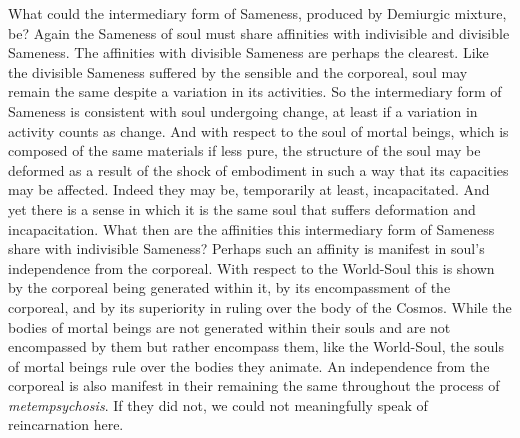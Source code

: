 What could the intermediary form of Sameness, produced by Demiurgic mixture, be? Again the Sameness of soul must share affinities with indivisible and divisible Sameness. The affinities with divisible Sameness are perhaps the clearest. Like the divisible Sameness suffered by the sensible and the corporeal, soul may remain the same despite a variation in its activities. So the intermediary form of Sameness is consistent with soul undergoing change, at least if a variation in activity counts as change. And with respect to the soul of mortal beings, which is composed of the same materials if less pure, the structure of the soul may be deformed as a result of the shock of embodiment in such a way that its capacities may be affected. Indeed they may be, temporarily at least, incapacitated. And yet there is a sense in which it is the same soul that suffers deformation and incapacitation. What then are the affinities this intermediary form of Sameness share with indivisible Sameness? Perhaps such an affinity is manifest in soul's independence from the corporeal. With respect to the World-Soul this is shown by the corporeal being generated within it, by its encompassment of the corporeal, and by its superiority in ruling over the body of the Cosmos. While the bodies of mortal beings are not generated within their souls and are not encompassed by them but rather encompass them, like the World-Soul, the souls of mortal beings rule over the bodies they animate. An independence from the corporeal is also manifest in their remaining the same throughout the process of \emph{metempsychosis}. If they did not, we could not meaningfully speak of reincarnation here.

